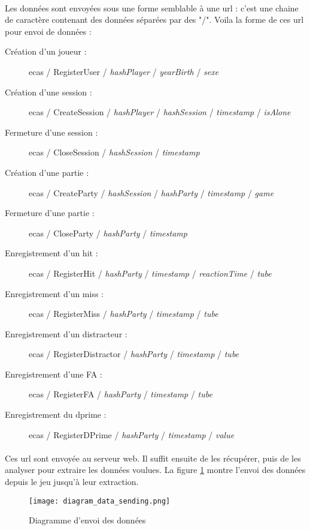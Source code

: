\paragraph{}Les données sont envoyées sous une forme semblable à une url : c'est une chaine de caractère contenant des données séparées par des "/". Voila la forme de ces url pour
envoi de données :
\begin{description}
    \item[Création d'un joueur :] ecas / RegisterUser / \textit{hashPlayer} / \textit{yearBirth} / \textit{sexe}
    \item[Création d'une session :] ecas / CreateSession / \textit{hashPlayer} / \textit{hashSession} / \textit{timestamp} / \textit{isAlone}
    \item[Fermeture d'une session :] ecas / CloseSession / \textit{hashSession} / \textit{timestamp}
    \item[Création d'une partie :] ecas / CreateParty / \textit{hashSession} / \textit{hashParty} / \textit{timestamp} / \textit{game}
    \item[Fermeture d'une partie :] ecas / CloseParty / \textit{hashParty} / \textit{timestamp}
    \item[Enregistrement d'un hit :] ecas / RegisterHit / \textit{hashParty} / \textit{timestamp} / \textit{reactionTime} / \textit{tube}
    \item[Enregistrement d'un miss :] ecas / RegisterMiss / \textit{hashParty} / \textit{timestamp} / \textit{tube}
    \item[Enregistrement d'un distracteur :] ecas / RegisterDistractor / \textit{hashParty} / \textit{timestamp} / \textit{tube}
    \item[Enregistrement d'une FA :] ecas / RegisterFA / \textit{hashParty} / \textit{timestamp} / \textit{tube}
    \item[Enregistrement du dprime :] ecas / RegisterDPrime / \textit{hashParty} / \textit{timestamp} / \textit{value}
\end{description}

\paragraph{}Ces url sont envoyée au serveur web. Il suffit ensuite de les récupérer, puis de les analyser pour extraire les données voulues. La figure \ref{DataSending} montre l'envoi
des données depuis le jeu jusqu'à leur extraction.

\begin{figure}[H]
    \begin{center}
    \texttt{[image: diagram\_data\_sending.png]}
    \end{center}
    \caption{Diagramme d'envoi des données}
\label{DataSending}
\end{figure}


